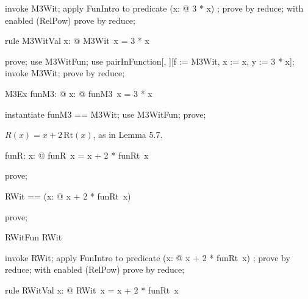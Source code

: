 \documentclass{article}
\begin{document}
\begin{zproof}
invoke M3Wit;
apply FunIntro to predicate (\lambda x: \nat @ 3 * x) \in \nat \fun \nat;
prove by reduce;
with enabled (RelPow) prove by reduce;
\end{zproof}

\begin{theorem}{rule M3WitVal}
  \forall x: \nat @ M3Wit~x = 3 * x
\end{theorem}

\begin{zproof}
prove;
use M3WitFun;
use pairInFunction[\nat, \nat][f := M3Wit, x := x, y := 3 * x];
invoke M3Wit;
prove by reduce;
\end{zproof}

\begin{theorem}{M3Ex}
  \exists funM3: \nat \fun \nat @ \forall x: \nat @ funM3~x = 3 * x
\end{theorem}

\begin{zproof}
instantiate funM3 == M3Wit;
use M3WitFun;
prove;
\end{zproof}

$R(x) = x + 2\,\mathrm{Rt}(x)$, as in Lemma 5.7.

\begin{axdef}
  funR: \nat \fun \nat
\where
   \forall x: \nat @ funR~x = x + 2 * funRt~x
\end{axdef}

\begin{zproof}
prove;
\end{zproof}

\begin{zed}
  RWit == (\lambda x: \nat @ x + 2 * funRt~x)
\end{zed}

\begin{zproof}
prove;
\end{zproof}

\begin{theorem}{RWitFun}
  RWit \in \nat \fun \nat
\end{theorem}

\begin{zproof}
invoke RWit;
apply FunIntro to predicate (\lambda x: \nat @ x + 2 * funRt~x) \in \nat \fun \nat;
prove by reduce;
with enabled (RelPow) prove by reduce;
\end{zproof}

\begin{theorem}{rule RWitVal}
  \forall x: \nat @ RWit~x = x + 2 * funRt~x
\end{theorem}
\end{document}
